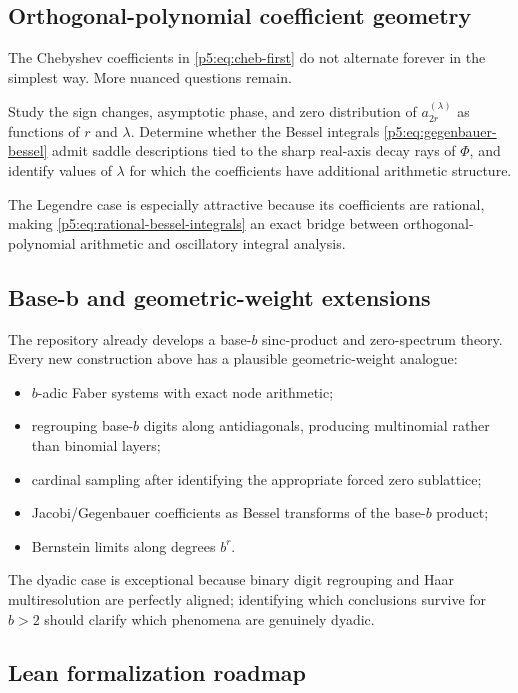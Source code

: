 \documentclass[11pt,oneside]{article}
\theoremstyle{definition}
\begin{document}
\subsection{Orthogonal-polynomial coefficient geometry}

The Chebyshev coefficients in \eqref{p5:eq:cheb-first} do not alternate forever
in the simplest way.  More nuanced questions remain.

\begin{problem}
Study the sign changes, asymptotic phase, and zero distribution of
$a_{2r}^{(\lambda)}$ as functions of $r$ and $\lambda$.  Determine whether the
Bessel integrals \eqref{p5:eq:gegenbauer-bessel} admit saddle descriptions tied
to the sharp real-axis decay rays of $\Phi$, and identify values of
$\lambda$ for which the coefficients have additional arithmetic structure.
\end{problem}

The Legendre case is especially attractive because its coefficients are
rational, making \eqref{p5:eq:rational-bessel-integrals} an exact bridge between
orthogonal-polynomial arithmetic and oscillatory integral analysis.

\subsection{Base-b and geometric-weight extensions}

The repository already develops a base-$b$ sinc-product and zero-spectrum
theory.  Every new construction above has a plausible geometric-weight
analogue:
\begin{itemize}
\item $b$-adic Faber systems with exact node arithmetic;
\item regrouping base-$b$ digits along antidiagonals, producing multinomial
      rather than binomial layers;
\item cardinal sampling after identifying the appropriate forced zero
      sublattice;
\item Jacobi/Gegenbauer coefficients as Bessel transforms of the base-$b$
      product;
\item Bernstein limits along degrees $b^r$.
\end{itemize}
The dyadic case is exceptional because binary digit regrouping and Haar
multiresolution are perfectly aligned; identifying which conclusions survive
for $b>2$ should clarify which phenomena are genuinely dyadic.

\subsection{Lean formalization roadmap}
\end{document}
